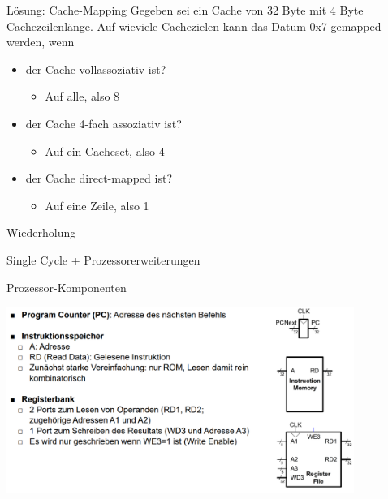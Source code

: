 \documentclass[
  german,            %
  aspectratio=169,    %
]{tumbeamer}
\begin{document}
\begin{frame}[c]{Lösung: Cache-Mapping}{}
	Gegeben sei ein Cache von 32 Byte mit 4 Byte Cachezeilenlänge. Auf wieviele Cachezielen kann das Datum 0x7 gemapped werden, wenn
	\vspace{0.5cm}
	\begin{itemize}
		\item der Cache vollassoziativ ist?
		\begin{itemize}
			\item Auf alle, also 8
		\end{itemize}
		\item der Cache 4-fach assoziativ ist?
		\begin{itemize}
			\item Auf ein Cacheset, also 4
		\end{itemize}
		\item der Cache direct-mapped ist?
		\begin{itemize}
			\item Auf eine Zeile, also 1
		\end{itemize}
	\end{itemize}
\end{frame}

\begin{frame}[c]{Wiederholung}{}
	\begin{center}
	  \LARGE Single Cycle + Prozessorerweiterungen
	\end{center}
\end{frame}


\begin{frame}[c, fragile]{Prozessor-Komponenten}{}
	\begin{center}
		\includegraphics[width=0.85\textwidth]{w08_prozessorcomponents1_lv.png}
	\end{center}
\end{frame}
\end{document}
